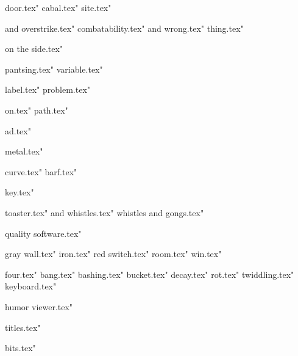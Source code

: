 

 door.tex"
 cabal.tex"
 site.tex"




 and overstrike.tex"
 combatability.tex"
 and wrong.tex"
 thing.tex"

 on the side.tex"


 pantsing.tex"
 variable.tex"

 label.tex"
 problem.tex"

 on.tex"
 path.tex"

 ad.tex"


 metal.tex"










 curve.tex"
 barf.tex"







 key.tex"


 toaster.tex"
 and whistles.tex"
 whistles and gongs.tex"

 quality software.tex"








 gray wall.tex"
 iron.tex"
 red switch.tex"
 room.tex"
 win.tex"



 four.tex"
 bang.tex"
 bashing.tex"
 bucket.tex"
 decay.tex"
 rot.tex"
 twiddling.tex"
 keyboard.tex"


 humor viewer.tex"


 titles.tex"






 bits.tex"



